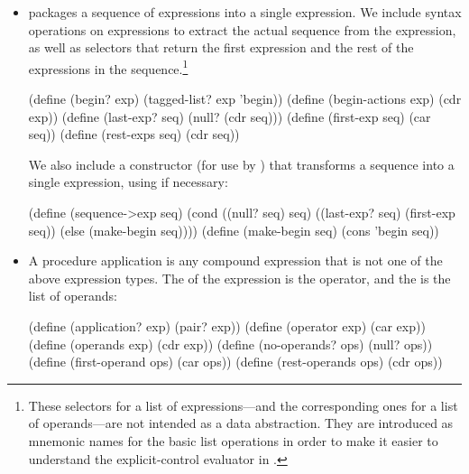 \begin{itemize}
\begin{codeBlock}
(define (if? exp) (tagged-list? exp 'if))
(define (if-predicate exp) (cadr exp))
(define (if-consequent exp) (caddr exp))
(define (if-alternative exp)
  (if (not (null? (cdddr exp)))
      (cadddr exp)
      'false))
\end{codeBlock}

We also provide a constructor for  expressions, to be used by
 to transform  expressions into 
expressions:

\begin{codeBlock}
(define (make-if predicate consequent alternative)
  (list 'if predicate consequent alternative))
\end{codeBlock}

\item
{} packages a sequence of expressions into a single expression.  We
include syntax operations on  expressions to extract the actual
sequence from the  expression, as well as selectors that return the
first expression and the rest of the expressions in the
sequence.\footnote{These selectors for a list of expressions---and the
corresponding ones for a list of operands---are not intended as a data
abstraction.  They are introduced as mnemonic names for the basic list
operations in order to make it easier to understand the explicit-control
evaluator in .}

\begin{codeBlock}
(define (begin? exp) (tagged-list? exp 'begin))
(define (begin-actions exp) (cdr exp))
(define (last-exp? seq) (null? (cdr seq)))
(define (first-exp seq) (car seq))
(define (rest-exps seq) (cdr seq))
\end{codeBlock}

We also include a constructor  (for use by )
that transforms a sequence into a single expression, using  if
necessary:

\begin{codeBlock}
(define (sequence->exp seq)
  (cond ((null? seq) seq)
        ((last-exp? seq) (first-exp seq))
        (else (make-begin seq))))
(define (make-begin seq) (cons 'begin seq))
\end{codeBlock}

\item
A procedure application is any compound expression that is not one of the above
expression types.  The  of the expression is the operator, and the
 is the list of operands:

\begin{codeBlock}
(define (application? exp) (pair? exp))
(define (operator exp) (car exp))
(define (operands exp) (cdr exp))
(define (no-operands? ops) (null? ops))
(define (first-operand ops) (car ops))
(define (rest-operands ops) (cdr ops))
\end{codeBlock}
\end{itemize}

